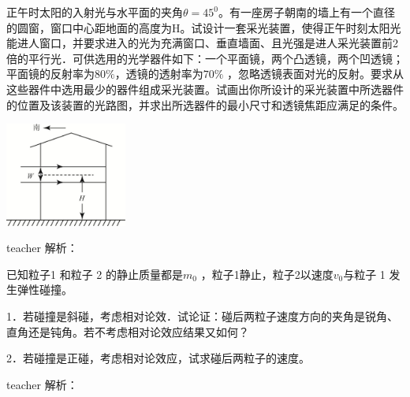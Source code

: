 \begin{example}
正午时太阳的入射光与水平面的夹角$\theta=45^0$。有一座房子朝南的墙上有一个直径 的圆窗，窗口中心距地面的高度为H。试设计一套采光装置，使得正午时刻太阳光能进人窗口，并要求进入的光为充满窗口、垂直墙面、且光强是进人采光装置前2倍的平行光．可供选用的光学器件如下：一个平面镜，两个凸透镜，两个凹透镜；平面镜的反射率为$80\%$，透镜的透射率为$70\%$ ，忽略透镜表面对光的反射。要求从这些器件中选用最少的器件组成采光装置。试画出你所设计的采光装置中所选器件的位置及该装置的光路图，并求出所选器件的最小尺寸和透镜焦距应满足的条件。
\begin{flushright}
\includegraphics[width = 0.3\textwidth]{images/problem-8.pdf} 
\end{flushright}
\begin{taggedblock}{teacher}
解析：
\end{taggedblock}
\end{example}


\begin{example}
已知粒子1 和粒子 2 的静止质量都是$m_0$ ，粒子1静止，粒子2以速度$v_0$与粒子 1 发生弹性碰撞。

1．若碰撞是斜碰，考虑相对论效．试论证：碰后两粒子速度方向的夹角是锐角、直角还是钝角。若不考虑相对论效应结果又如何？

2．若碰撞是正碰，考虑相对论效应，试求碰后两粒子的速度。

\begin{taggedblock}{teacher}
解析：
\end{taggedblock}
\end{example}



